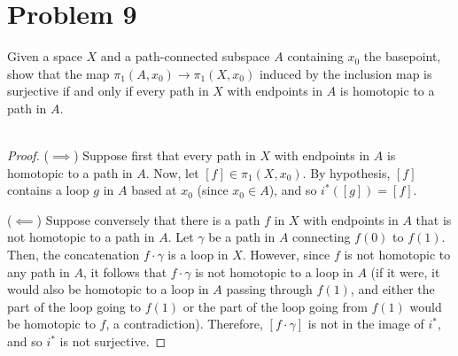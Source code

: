 \documentclass[fontsize=11pt]{scrartcl} %
\numberwithin{equation}{section} %
\numberwithin{figure}{section} %
\numberwithin{table}{section} %
\begin{document}
\section*{Problem 9}
Given a space $X$ and a path-connected subspace $A$ containing $x_0$ the
basepoint, show that the map $\pi_1(A,x_0)\to \pi_1(X,x_0)$ induced by the
inclusion map is surjective if and only if every path in $X$ with endpoints in
$A$ is homotopic to a path in $A$.
\\
\\
\begin{proof}
    ($\implies$)
    Suppose first that every path in $X$ with endpoints in $A$ is homotopic to a
    path in $A$. Now, let $[f]\in\pi_1(X,x_0)$. By hypothesis, $[f]$ contains a
    loop $g$ in $A$ based at $x_0$ (since $x_0\in A$), and so $i^*([g]) = [f]$.

    ($\impliedby$)
    Suppose conversely that there is a path $f$ in $X$ with endpoints in $A$
    that is not homotopic to a path in $A$. Let $\gamma$ be a path in $A$
    connecting $f(0)$ to $f(1)$. Then, the concatenation $f\cdot\gamma$ is a
    loop in $X$. However, since $f$ is not homotopic to any path in $A$, it
    follows that $f\cdot\gamma$ is not homotopic to a loop in $A$ (if it were,
    it would also be homotopic to a loop in $A$ passing through $f(1)$, and
    either the part of the loop going to $f(1)$ or the part of the loop going
    from $f(1)$ would be homotopic to $f$, a contradiction). Therefore,
    $[f\cdot\gamma]$ is not in the image of $i^*$, and so $i^*$ is not
    surjective.
\end{proof}
\end{document}

